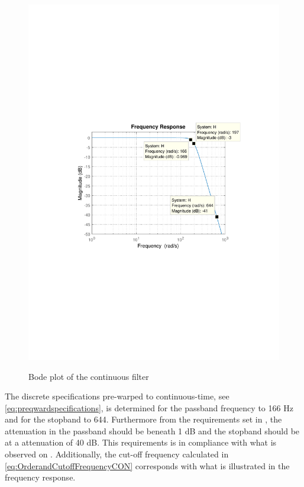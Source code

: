 \begin{figure}[H]
  \centering
  {
    \includegraphics[width=1.1\textwidth]{figures/ContinusFilterResponse.pdf}
  }
  \caption{Bode plot of the continuous filter}
  \label{fig:Continuoustimebodeplot}
\end{figure}
%
The discrete specifications pre-warped to continuous-time, see \eqref{eq:preqwardspecifications}, is determined for the passband frequency to 166 \si{Hz} and for the stopband to \si{644}. Furthermore from the requirements set in , the attenuation in the passband should be beneath 1 \si{dB} and the stopband should be at a attenuation of 40 \si{dB}. This requirements is in compliance with what is observed on . Additionally, the cut-off frequency calculated in \eqref{eq:OrderandCutoffFrequencyCON} corresponds with what is illustrated in the frequency response.

